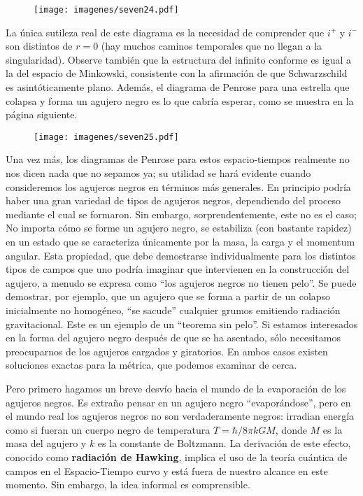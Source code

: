 \documentclass[11pt,b5paper,openany,twoside]{book}
\begin{document}
\begin{figure}[h]
\centering
\texttt{[image: imagenes/seven24.pdf]}
\end{figure}

\noindent
La única sutileza real de este diagrama es la necesidad de comprender que $i^+$ y $i^-$ son distintos de $r=0$ (hay muchos caminos temporales que no llegan a la singularidad).
Observe también que la estructura del infinito conforme es igual a la del espacio de Minkowski, consistente con la afirmación de que Schwarzschild es asintóticamente plano.
Además, el diagrama de Penrose para una estrella que colapsa y forma un agujero negro es lo que cabría esperar, como se muestra en la página siguiente.

\begin{figure}[h]
\centering
\texttt{[image: imagenes/seven25.pdf]}
\end{figure}

Una vez más, los diagramas de Penrose para estos espacio-tiempos realmente no nos dicen nada que no sepamos ya; su utilidad se hará evidente cuando consideremos los agujeros negros en términos más generales.
En principio podría haber una gran variedad de tipos de agujeros negros, dependiendo del proceso mediante el cual se formaron.
Sin embargo, sorprendentemente, este no es el caso; No importa cómo se forme un agujero negro, se estabiliza (con bastante rapidez) en un estado que se caracteriza únicamente por la masa, la carga y el momentum angular.
Esta propiedad, que debe demostrarse individualmente para los distintos tipos de campos que uno podría imaginar que intervienen en la construcción del agujero, a menudo se expresa como ``los agujeros negros no tienen pelo''. Se puede demostrar, por ejemplo, que un agujero que se forma a partir de un colapso inicialmente no homogéneo, ``se sacude'' cualquier grumos emitiendo radiación gravitacional.
Este es un ejemplo de un ``teorema sin pelo''. Si estamos interesados en la forma del agujero negro después de que se ha asentado, sólo necesitamos preocuparnos de los agujeros cargados y giratorios.
En ambos casos existen soluciones exactas para la métrica, que podemos examinar de cerca.

Pero primero hagamos un breve desvío hacia el mundo de la evaporación de los agujeros negros.
Es extraño pensar en un agujero negro ``evaporándose'', pero en el mundo real los agujeros negros no son verdaderamente negros: irradian energía como si fueran un cuerpo negro de temperatura $T=\hbar/8\pi kGM$, donde $M$ es la masa del agujero y $k$ es la constante de Boltzmann.
La derivación de este efecto, conocido como {\bf radiación de Hawking}, implica el uso de la teoría cuántica de campos en el Espacio-Tiempo curvo y está fuera de nuestro alcance en este momento.
Sin embargo, la idea informal es comprensible.
\end{document}
